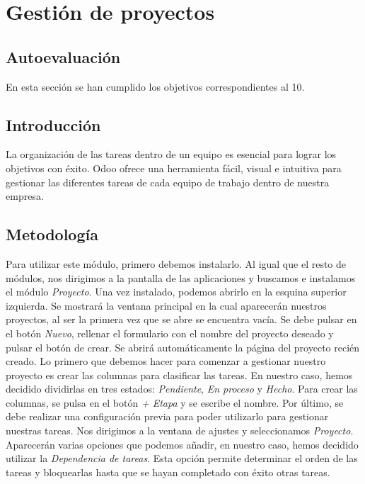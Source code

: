 \section{Gestión de proyectos}

\subsection{Autoevaluación}
En esta sección se han cumplido los objetivos correspondientes al 10.

\subsection{Introducción}

La organización de las tareas dentro de un equipo es esencial para lograr los objetivos con éxito. Odoo ofrece una herramienta fácil, visual e intuitiva para gestionar las diferentes tareas de cada equipo de trabajo dentro de nuestra empresa.

\subsection{Metodología}

Para utilizar este módulo, primero debemos instalarlo. Al igual que el resto de módulos, nos dirigimos a la pantalla de las aplicaciones y buscamos e instalamos el módulo \textit{Proyecto}. Una vez instalado, podemos abrirlo en la esquina superior izquierda. Se mostrará la ventana principal en la cual aparecerán nuestros proyectos, al ser la primera vez que se abre se encuentra vacía. Se debe pulsar en el botón \textit{Nuevo}, rellenar el formulario con el nombre del proyecto deseado y pulsar el botón de crear. Se abrirá automáticamente la página del proyecto recién creado. Lo primero que debemos hacer para comenzar a gestionar nuestro proyecto es crear las columnas para clasificar las tareas. En nuestro caso, hemos decidido dividirlas en tres estados: \textit{Pendiente}, \textit{En proceso} y \textit{Hecho}. Para crear las columnas, se pulsa en el botón \textit{+ Etapa} y se escribe el nombre. Por último, se debe realizar una configuración previa para poder utilizarlo para gestionar nuestras tareas. Nos dirigimos a la ventana de ajustes y seleccionamos \textit{Proyecto}. Aparecerán varias opciones que podemos añadir, en nuestro caso, hemos decidido utilizar la \textit{Dependencia de tareas}. Esta opción permite determinar el orden de las tareas y bloquearlas hasta que se hayan completado con éxito otras tareas.

